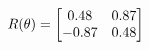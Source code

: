 \documentclass[preview]{standalone}
\begin{document}
\begin{align*}
\special{dvisvgm:raw <g id='unique000'>}R(\theta) = \begin{bmatrix}0.48 & 0.87\\-0.87 & 0.48\end{bmatrix}\special{dvisvgm:raw </g>}
\end{align*}
\end{document}
